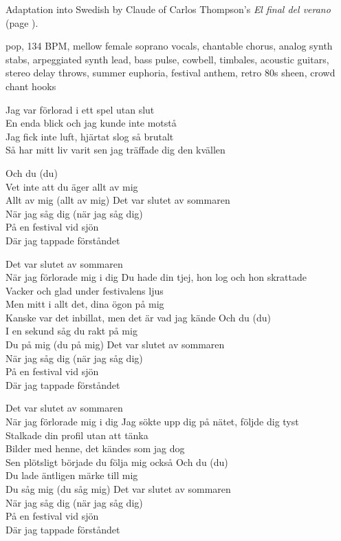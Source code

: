 
\begin{notes}
Adaptation into Swedish by Claude of Carlos Thompson's \emph{El final del verano} (page \pageref{sec:verano}).
\end{notes}
\begin{style}
pop, 134 BPM, mellow female soprano vocals, chantable chorus, analog synth stabs, arpeggiated synth lead, bass pulse, cowbell, timbales, acoustic guitars, stereo delay throws, summer euphoria, festival anthem, retro 80s sheen, crowd chant hooks
\end{style}
\begin{lyrics}
Jag var förlorad i ett spel utan slut\\
En enda blick och jag kunde inte motstå\\
Jag fick inte luft, hjärtat slog så brutalt\\
Så har mitt liv varit sen jag träffade dig den kvällen

Och du (du)\\
Vet inte att du äger allt av mig\\
Allt av mig (allt av mig)
Det var slutet av sommaren\\
När jag såg dig (när jag såg dig)\\
På en festival vid sjön\\
Där jag tappade förståndet

Det var slutet av sommaren\\
När jag förlorade mig i dig
Du hade din tjej, hon log och hon skrattade\\
Vacker och glad under festivalens ljus\\
Men mitt i allt det, dina ögon på mig\\
Kanske var det inbillat, men det är vad jag kände
Och du (du)\\
I en sekund såg du rakt på mig\\
Du på mig (du på mig)
Det var slutet av sommaren\\
När jag såg dig (när jag såg dig)\\
På en festival vid sjön\\
Där jag tappade förståndet

Det var slutet av sommaren\\
När jag förlorade mig i dig
Jag sökte upp dig på nätet, följde dig tyst\\
Stalkade din profil utan att tänka\\
Bilder med henne, det kändes som jag dog\\
Sen plötsligt började du följa mig också
Och du (du)\\
Du lade äntligen märke till mig\\
Du såg mig (du såg mig)
Det var slutet av sommaren\\
När jag såg dig (när jag såg dig)\\
På en festival vid sjön\\
Där jag tappade förståndet


\end{lyrics}
